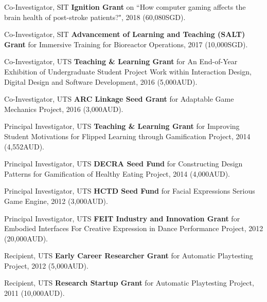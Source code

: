 \documentclass[10pt,a4paper]{article}
\renewenvironment{itemize}{
  \begin{list}{}{
    \setlength{\leftmargin}{1.5em}
    \setlength{\itemsep}{0.25em}
    \setlength{\parskip}{0pt}
    \setlength{\parsep}{0.25em}
  }
}{
  \end{list}
}
\begin{document}
\begin{itemize}
    \item Co-Investigator, SIT \textbf{Ignition Grant} on ``How computer gaming affects the brain health of post-stroke patients?", 2018 (60,080SGD).

    \item Co-Investigator, SIT \textbf{Advancement of Learning and Teaching (SALT) Grant} for Immersive Training for Bioreactor Operations, 2017 (10,000SGD).

    \item Co-Investigator, UTS \textbf{Teaching \& Learning Grant} for An End-of-Year Exhibition of Undergraduate Student Project Work within Interaction Design, Digital Design and Software Development, 2016 (5,000AUD).

    \item Co-Investigator, UTS \textbf{ARC Linkage Seed Grant} for Adaptable Game Mechanics Project, 2016 (3,000AUD).

    \item Principal Investigator, UTS \textbf{Teaching \& Learning Grant} for Improving Student Motivations for Flipped Learning through Gamification Project, 2014 (4,552AUD).

    \item Principal Investigator, UTS \textbf{DECRA Seed Fund} for Constructing Design Patterns for Gamification of Healthy Eating Project, 2014 (4,000AUD).

    \item Principal Investigator, UTS \textbf{HCTD Seed Fund} for Facial Expressions Serious Game Engine, 2012 (3,000AUD).

    \item Principal Investigator, UTS \textbf{FEIT Industry and Innovation Grant} for Embodied Interfaces For Creative Expression in Dance Performance Project, 2012 (20,000AUD).

    \item Recipient, UTS \textbf{Early Career Researcher Grant} for Automatic Playtesting Project, 2012 (5,000AUD).

    \item Recipient, UTS \textbf{Research Startup Grant} for Automatic Playtesting Project, 2011 (10,000AUD).

\end{itemize}

\end{document}
